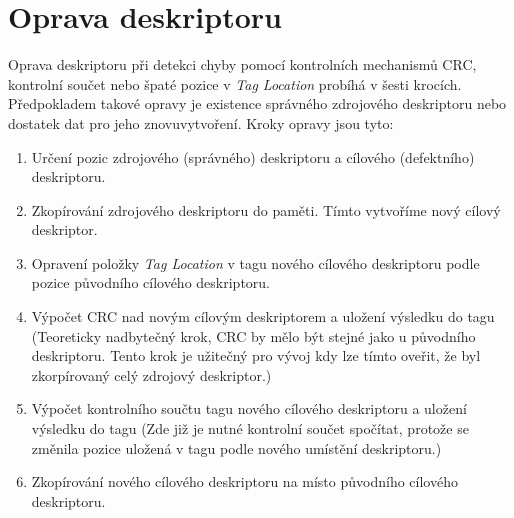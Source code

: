 \section{Oprava deskriptoru}
\label{sec:oprava-deskriptoru}
Oprava deskriptoru při detekci chyby pomocí kontrolních mechanismů CRC, kontrolní součet nebo špaté pozice v \textit{Tag Location} probíhá v šesti krocích. Předpokladem takové opravy je existence správného zdrojového deskriptoru nebo dostatek dat pro jeho znovuvytvoření. Kroky opravy jsou tyto:
\begin{enumerate}
    \item Určení pozic zdrojového (správného) deskriptoru a cílového (defektního) deskriptoru.
    \item Zkopírování zdrojového deskriptoru do paměti. Tímto vytvoříme nový cílový deskriptor.
    \item Opravení položky \textit{Tag Location} v tagu nového cílového deskriptoru podle pozice původního cílového deskriptoru.
    \item Výpočet CRC nad novým cílovým deskriptorem a uložení výsledku do tagu (Teoreticky nadbytečný krok, CRC by mělo být stejné jako u původního deskriptoru. Tento krok je užitečný pro vývoj kdy lze tímto oveřit, že byl zkorpírovaný celý zdrojový deskriptor.)
    \item Výpočet kontrolního součtu tagu nového cílového deskriptoru a uložení výsledku do tagu (Zde již je nutné kontrolní součet spočítat, protože se změnila pozice uložená v tagu podle nového umístění deskriptoru.)
    \item Zkopírování nového cílového deskriptoru na místo původního cílového deskriptoru.
\end{enumerate}

